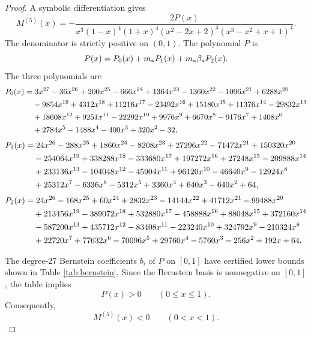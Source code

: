 \begin{proof}
A symbolic differentiation gives
\begin{equation}\label{eq:M5}
  M^{(5)}(x)=-\frac{2P(x)}{x^3(1-x)^4(1+x)^4(x^2-2x+2)^4(x^3-x^2+x+1)^4}.
\end{equation}
The denominator is strictly positive on \((0,1)\).  The polynomial \(P\) is
\begin{equation}\label{eq:Pdecomp}
  P(x)=P_0(x)+m_* P_1(x)+m_*\beta_* P_2(x).
\end{equation}
The three polynomials are
\begin{align}\label{eq:P0}
P_0(x)=&\;3x^{27}-36x^{26}+200x^{25}-666x^{24}+1364x^{23}-1360x^{22}
-1096x^{21}+6288x^{20}\notag\\
&-9854x^{19}+4312x^{18}+11216x^{17}-23492x^{16}+15180x^{15}+11376x^{14}-29832x^{13}\notag\\
&+18608x^{12}+9251x^{11}-22292x^{10}+9976x^9+6670x^8-9176x^7+1408x^6\notag\\
&+2784x^5-1488x^4-400x^3+320x^2-32,
\end{align}
\begin{align}\label{eq:P1}
P_1(x)=&\;24x^{26}-288x^{25}+1860x^{24}-8208x^{23}+27296x^{22}-71472x^{21}+150320x^{20}\notag\\
&-254064x^{19}+338288x^{18}-333680x^{17}+197272x^{16}+27248x^{15}-209888x^{14}\notag\\
&+233136x^{13}-104048x^{12}-45904x^{11}+96120x^{10}-46640x^9-12924x^8\notag\\
&+25312x^7-6336x^6-5312x^5+3360x^4+640x^3-640x^2+64,
\end{align}
\begin{align}\label{eq:P2}
P_2(x)=&\;24x^{26}-168x^{25}+60x^{24}+2832x^{23}-14144x^{22}+41712x^{21}-99488x^{20}\notag\\
&+213456x^{19}-389072x^{18}+532880x^{17}-458888x^{16}+88048x^{15}+372160x^{14}\notag\\
&-587200x^{13}+435712x^{12}-83408x^{11}-223240x^{10}+324792x^9-210324x^8\notag\\
&+22720x^7+77632x^6-70096x^5+29760x^4-5760x^3-256x^2+192x+64.
\end{align}

The degree-27 Bernstein coefficients \(b_i\) of \(P\) on \([0,1]\) have certified lower bounds shown in Table \ref{tab:bernstein}.  Since the Bernstein basis is nonnegative on \([0,1]\), the table implies
\begin{equation}\label{eq:Ppositive}
  P(x)>0\qquad(0\le x\le1).
\end{equation}
Consequently,
\begin{equation}\label{eq:M5negative}
  M^{(5)}(x)<0\qquad(0<x<1).
\end{equation}


\end{proof}
